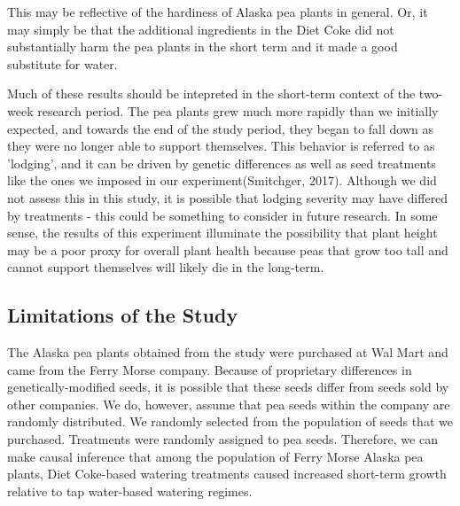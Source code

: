 \documentclass[1p,12pt]{elsarticle}\usepackage[]{graphicx}\usepackage[]{color}
\begin{document}
This may be reflective of the hardiness of Alaska pea plants in general. Or, it may simply be that the additional ingredients in the Diet Coke did not substantially harm the pea plants in the short term and it made a good substitute for water.

Much of these results should be intepreted in the short-term context of the two-week research period. The pea plants grew much more rapidly than we initially expected, and towards the end of the study period, they began to fall down as they were no longer able to support themselves. This behavior is referred to as 'lodging', and it can be driven by genetic differences as well as seed treatments like the ones we imposed in our experiment(Smitchger, 2017). Although we did not assess this in this study, it is possible that lodging severity may have differed by treatments - this could be something to consider in future research. In some sense, the results of this experiment illuminate the possibility that plant height may be a poor proxy for overall plant health because peas that grow too tall and cannot support themselves will likely die in the long-term. 

\subsection{Limitations of the Study}

The Alaska pea plants obtained from the study were purchased at Wal Mart and came from the Ferry Morse company. Because of proprietary differences in genetically-modified seeds, it is possible that these seeds differ from seeds sold by other companies. We do, however, assume that pea seeds within the company are randomly distributed. We randomly selected from the population of seeds that we purchased.  Treatments were randomly assigned to pea seeds. Therefore, we can make causal inference that among the population of Ferry Morse Alaska pea plants, Diet Coke-based watering treatments caused  increased short-term growth relative to tap water-based watering regimes. 
\end{document}
